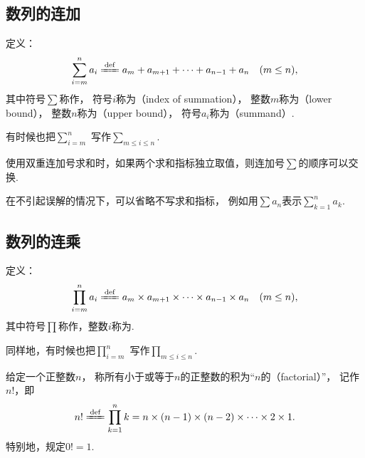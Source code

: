 \subsection{数列的连加}
\begin{definition}[连加]
定义：\[
	\sum\limits_{i=m}^n a_i
	\defeq
	a_m + a_{m+1} + \dotsb + a_{n-1} + a_n
	\quad(m \leq n),
\]其中符号\(\sum\)称作，
符号\(i\)称为（index of summation），
整数\(m\)称为（lower bound），
整数\(n\)称为（upper bound），
符号\(a_i\)称为（summand）.
\end{definition}

\begin{figure}[ht]
	\centering
	\caption{}
\end{figure}

有时候也把\(\sum\limits_{i=m}^n\)%
写作\(\sum\limits_{m \leq i \leq n}\).

使用双重连加号求和时，如果两个求和指标独立取值，则连加号\(\sum\)的顺序可以交换.

在不引起误解的情况下，可以省略不写求和指标，
例如用\(\sum a_n\)表示\(\sum\limits_{k=1}^n a_k\).

\subsection{数列的连乘}
\begin{definition}[连乘]
定义：\[
\prod\limits_{i=m}^n a_i
\defeq
a_m \times a_{m+1} \times \dotsb \times a_{n-1} \times a_n
\quad(m \leq n),
\]其中符号\(\prod\)称作，整数\(i\)称为.
\end{definition}

同样地，有时候也把\(\prod\limits_{i=m}^n\)%
写作\(\prod\limits_{m \leq i \leq n}\).

\begin{definition}\label{definition:数列.阶乘的定义}
给定一个正整数\(n\)，
称所有小于或等于\(n\)的正整数的积为“\(n\)的（factorial）”，
记作\(n!\)，即
\begin{equation}
n!
\defeq
\prod\limits_{k=1}^n k
=
n \times (n-1) \times (n-2) \times \dotsm \times 2 \times 1.
\end{equation}
特别地，规定\(0! = 1\).
\end{definition}

